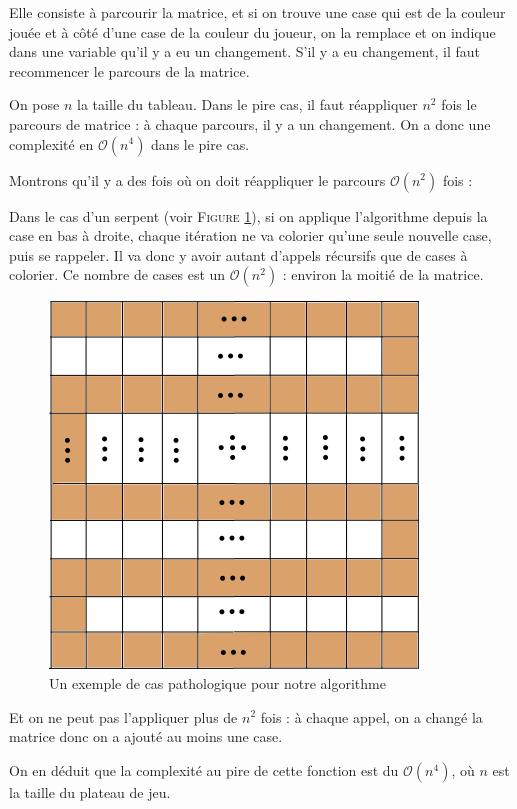\documentclass[12pt]{article}
\begin{document}
Elle consiste à parcourir la matrice, et si on trouve une case qui est de la couleur jouée et à côté d'une case de la couleur du joueur, on la remplace et on indique dans une variable qu'il y a eu un changement.
S'il y a eu changement, il faut recommencer le parcours de la matrice.

On pose $n$ la taille du tableau. Dans le pire cas, il faut réappliquer $n^2$ fois le parcours de matrice : à chaque parcours, il y a un changement. On a donc une complexité en $\mathcal{O}(n^4)$ dans le pire cas.

Montrons qu'il y a des fois où on doit réappliquer le parcours $\mathcal{O}(n^2)$ fois :

Dans le cas d'un serpent (voir \textsc{Figure }\ref{serpent}), si on applique l'algorithme depuis la case en bas à droite, chaque itération ne va colorier qu'une seule nouvelle case, puis se rappeler. Il va donc y avoir autant d'appels récursifs que de cases à colorier. Ce nombre de cases est un $\mathcal{O}(n^2)$ : environ la moitié de la matrice.

\begin{figure}
\center
\includegraphics[scale = 0.6]{serpent.png}
\caption{Un exemple de cas pathologique pour notre algorithme}
\label{serpent}
\end{figure}

Et on ne peut pas l'appliquer plus de $n^2$ fois : à chaque appel, on a changé la matrice donc on a ajouté au moins une case.

On en déduit que la complexité au pire de cette fonction est du $\mathcal{O}(n^4)$, où $n$ est la taille du plateau de jeu.
\end{document}
